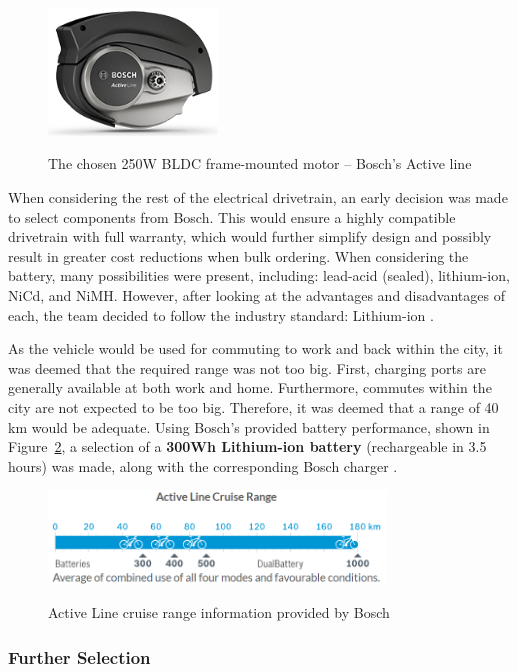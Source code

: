 \documentclass[a4paper,11pt]{article}
\begin{document}
\begin{figure}[!ht]
	\centering
	\includegraphics[width=0.4\textwidth]{bosmot}
	\caption{The chosen 250W BLDC frame-mounted motor -- Bosch's Active line}
	\cite{bosch18}
	\label{fig:bosmot}
\end{figure}

When considering the rest of the electrical drivetrain, an early decision was made to select components from Bosch. This would ensure a highly compatible drivetrain with full warranty, which would further simplify design and possibly result in greater cost reductions when bulk ordering. When considering the battery, many possibilities were present, including: lead-acid (sealed), lithium-ion, NiCd, and NiMH. However, after looking at the advantages and disadvantages of each, the team decided to follow the industry standard: Lithium-ion \cite{rag14}. 

As the vehicle would be used for commuting to work and back within the city, it was deemed that the required range was not too big. First, charging ports are generally available at both work and home. Furthermore, commutes within the city are not expected to be too big. Therefore, it was deemed that a range of 40 km would be adequate. Using Bosch's provided battery performance, shown in Figure~\ref{fig:crura}, a selection of a \textbf{300Wh Lithium-ion battery} (rechargeable in 3.5 hours) was made, along with the corresponding Bosch charger \cite{bosch18}.

\begin{figure}[ht]
	\centering
	\includegraphics[width=0.8\textwidth]{crura}
	\caption{Active Line cruise range information provided by Bosch}
	\cite{bosch18}
	\label{fig:crura}
\end{figure}

\subsubsection{Further Selection}
\end{document}
